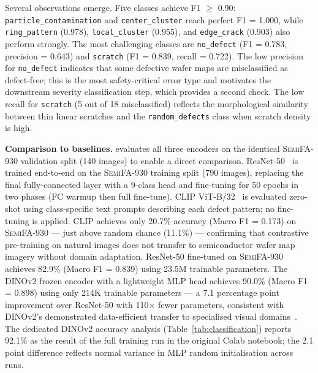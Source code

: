 \documentclass[conference]{IEEEtran}
\newcommand{\semidataset}{\textsc{SemiFA-930}}
\begin{document}
Several observations emerge.
Five classes achieve F1 $\geq$ 0.90: \texttt{particle\_contamination} and \texttt{center\_cluster} reach perfect F1 = 1.000, while \texttt{ring\_pattern} (0.978), \texttt{local\_cluster} (0.955), and \texttt{edge\_crack} (0.903) also perform strongly.
The most challenging classes are \texttt{no\_defect} (F1 = 0.783, precision = 0.643) and \texttt{scratch} (F1 = 0.839, recall = 0.722).
The low precision for \texttt{no\_defect} indicates that some defective wafer maps are misclassified as defect-free; this is the most safety-critical error type and motivates the downstream severity classification step, which provides a second check.
The low recall for \texttt{scratch} (5 out of 18 misclassified) reflects the morphological similarity between thin linear scratches and the \texttt{random\_defects} class when scratch density is high.

\textbf{Comparison to baselines.}  evaluates all three encoders on the identical \semidataset{} validation split (140 images) to enable a direct comparison.
ResNet-50~\cite{he2016resnet} is trained end-to-end on the \semidataset{} training split (790 images), replacing the final fully-connected layer with a 9-class head and fine-tuning for 50 epochs in two phases (FC warmup then full fine-tune).
CLIP ViT-B/32~\cite{radford2021clip} is evaluated zero-shot using class-specific text prompts describing each defect pattern; no fine-tuning is applied.
CLIP achieves only 20.7\% accuracy (Macro F1 = 0.173) on \semidataset{} --- just above random chance (11.1\%) --- confirming that contrastive pre-training on natural images does not transfer to semiconductor wafer map imagery without domain adaptation.
ResNet-50 fine-tuned on \semidataset{} achieves 82.9\% (Macro F1 = 0.839) using 23.5M trainable parameters.
The DINOv2 frozen encoder with a lightweight MLP head achieves 90.0\% (Macro F1 = 0.898) using only 214K trainable parameters --- a 7.1 percentage point improvement over ResNet-50 with 110$\times$ fewer parameters, consistent with DINOv2's demonstrated data-efficient transfer to specialised visual domains~\cite{oquab2024dinov2}.
The dedicated DINOv2 accuracy analysis (Table~\ref{tab:classification}) reports 92.1\% as the result of the full training run in the original Colab notebook; the 2.1 point difference reflects normal variance in MLP random initialisation across runs.
\end{document}
